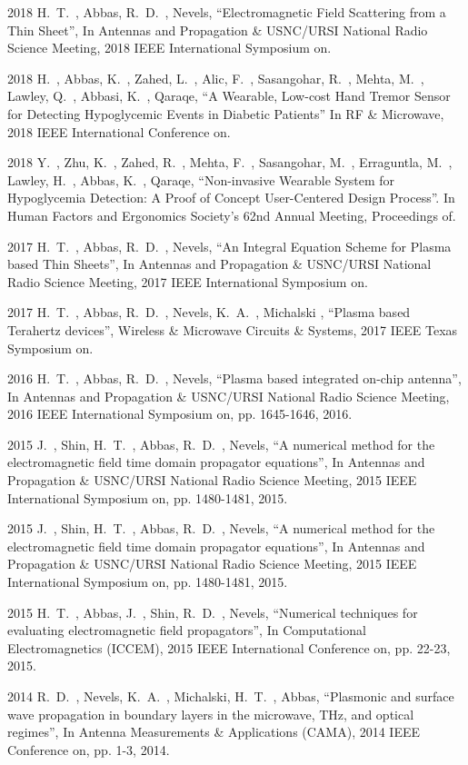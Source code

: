 \documentclass[10pt]{article}
\begin{document}
\begin{bibenum}

\item[2018] H.~T.~, Abbas, R.~D.~, Nevels, ``Electromagnetic Field Scattering from a Thin Sheet'', In Antennas and Propagation \& USNC/URSI National Radio Science Meeting, 2018 IEEE International Symposium on.

\item[2018] H.~, Abbas, K.~, Zahed, L.~, Alic, F.~, Sasangohar, R.~, Mehta, M.~, Lawley, Q.~, Abbasi, K.~, Qaraqe, ``A Wearable, Low-cost Hand Tremor Sensor for Detecting Hypoglycemic Events in Diabetic Patients'' In  RF \& Microwave, 2018 IEEE International Conference on.

\item[2018] Y.~, Zhu, K.~, Zahed, R.~, Mehta, F.~, Sasangohar, M.~, Erraguntla, M.~, Lawley, H.~, Abbas, K.~, Qaraqe, ``Non-invasive Wearable System for Hypoglycemia Detection: A Proof of Concept User-Centered Design Process''. In Human Factors and Ergonomics Society's 62nd Annual Meeting, Proceedings of.

\item[2017] H.~T.~, Abbas, R.~D.~, Nevels, ``An Integral Equation Scheme for Plasma based Thin Sheets'', In Antennas and Propagation \& USNC/URSI National Radio Science Meeting, 2017 IEEE International Symposium on.
\item[2017] H.~T.~, Abbas, R.~D.~, Nevels, K.~A.~, Michalski , ``Plasma based Terahertz devices'', Wireless \& Microwave Circuits \& Systems, 2017 IEEE Texas Symposium on.
\item[2016] H.~T.~, Abbas, R.~D.~, Nevels, ``Plasma based integrated on-chip antenna'', In Antennas and Propagation \& USNC/URSI National Radio Science Meeting, 2016 IEEE International Symposium on, pp. 1645-1646, 2016.
\item[2015] J.~, Shin, H.~T.~, Abbas, R.~D.~, Nevels, ``A numerical method for the electromagnetic field time domain propagator equations'', In Antennas and Propagation \& USNC/URSI National Radio Science Meeting, 2015 IEEE International Symposium on, pp. 1480-1481, 2015.
\item[2015] J.~, Shin, H.~T.~, Abbas, R.~D.~, Nevels, ``A numerical method for the electromagnetic field time domain propagator equations'', In Antennas and Propagation \& USNC/URSI National Radio Science Meeting, 2015 IEEE International Symposium on, pp. 1480-1481, 2015.
\item[2015] H.~T.~, Abbas, J.~, Shin, R.~D.~, Nevels, ``Numerical techniques for evaluating electromagnetic field propagators'', In Computational Electromagnetics (ICCEM), 2015 IEEE International Conference on, pp. 22-23, 2015.
\item[2014] R.~D.~, Nevels, K.~A.~, Michalski, H.~T.~, Abbas, ``Plasmonic and surface wave propagation in boundary layers in the microwave, THz, and optical regimes'', In Antenna Measurements \& Applications (CAMA), 2014 IEEE Conference on, pp. 1-3, 2014.

\end{bibenum}
\end{document}
